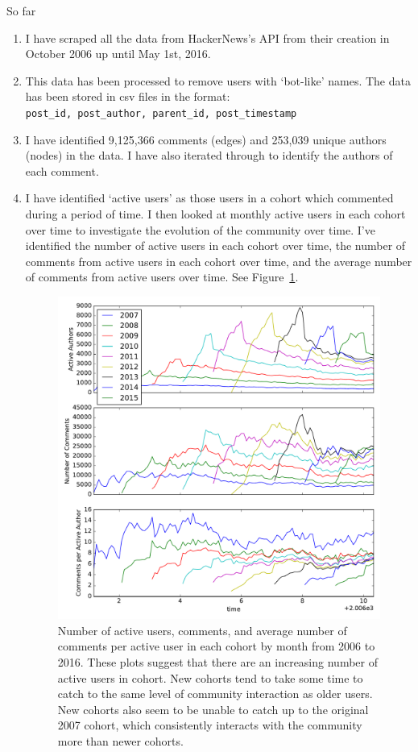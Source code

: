 \documentclass{tufte-handout}
\begin{document}
So far
\begin{enumerate}
\item I have scraped all the data from HackerNews's API from their creation in October 2006 up until May 1st, 2016.
\item This data has been processed to remove users with `bot-like' names. The data has been stored in csv files in the format: \\\texttt{post\_id, post\_author, parent\_id, post\_timestamp}
\item I have identified 9,125,366 comments (edges) and 253,039 unique authors (nodes) in the data. I have also iterated through to identify the authors of each comment.
\item I have identified `active users' as those users in a cohort which commented during a period of time. I then looked at monthly active users in each cohort over time to investigate the evolution of the community over time. I've identified the number of active users in each cohort over time, the number of comments from active users in each cohort over time, and the average number of comments from active users over time. See Figure~\ref{fig1}.
\begin{figure}
  \includegraphics{stats.pdf}
  \caption{Number of active users, comments, and average number of comments per active user in each cohort by month from 2006 to 2016. These plots suggest that there are an increasing number of active users in cohort. New cohorts tend to take some time to catch to the same level of community interaction as older users. New cohorts also seem to be unable to catch up to the original 2007 cohort, which consistently interacts with the community more than newer cohorts.
  }
  \label{fig1}
\end{figure}
\end{enumerate}
\end{document}
